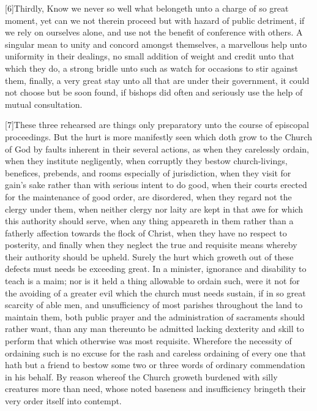 [6]Thirdly, Know we never so well what belongeth unto a charge of so great moment, yet can we not therein proceed but with hazard of public detriment, if we rely on ourselves alone, and use not the benefit of conference with others. A singular mean to unity and concord amongst themselves, a marvellous help unto uniformity in their dealings, no small addition of weight and credit unto that which they do, a strong bridle unto such as watch for occasions to stir against them, finally, a very great stay unto all that are under their government, it could not choose but be soon found, if bishops did often and seriously use the help of mutual consultation.

[7]These three rehearsed are things only preparatory unto the course of episcopal proceedings. But the hurt is more manifestly seen which doth grow to the Church of God by faults inherent in their several actions, as when they carelessly ordain, when they institute negligently, when corruptly they bestow church-livings, benefices, prebends, and rooms especially of jurisdiction, when they visit for gain’s sake rather than with serious intent to do good, when their courts erected for the maintenance of good order, are disordered, when they regard not the clergy under them, when neither clergy nor laity are kept in that awe for which this authority should serve,  when any thing appeareth in them rather than a fatherly affection towards the flock of Christ, when they have no respect to posterity, and finally when they neglect the true and requisite means whereby their authority should be upheld. Surely the hurt which groweth out of these defects must needs be exceeding great. In a minister, ignorance and disability to teach is a maim; nor is it held a thing allowable to ordain such, were it not for the avoiding of a greater evil which the church must needs sustain, if in so great scarcity of able men, and unsufficiency of most parishes throughout the land to maintain them, both public prayer and the administration of sacraments should rather want, than any man thereunto be admitted lacking dexterity and skill to perform that which otherwise was most requisite. Wherefore the necessity of ordaining such is no excuse for the rash and careless ordaining of every one that hath but a friend to bestow some two or three words of ordinary commendation in his behalf. By reason whereof the Church groweth burdened with silly creatures more than need, whose noted baseness and insufficiency bringeth their very order itself into contempt.

